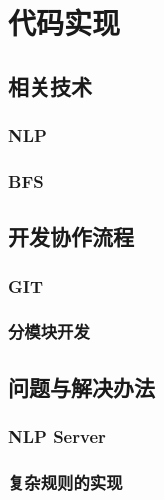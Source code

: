 \chapter{代码实现}

\section{相关技术}
    \subsection{NLP}
    \subsection{BFS}
\section{开发协作流程}
    \subsection{GIT}
    \subsection{分模块开发}
\section{问题与解决办法}
    \subsection{NLP Server}
    \subsection{复杂规则的实现}